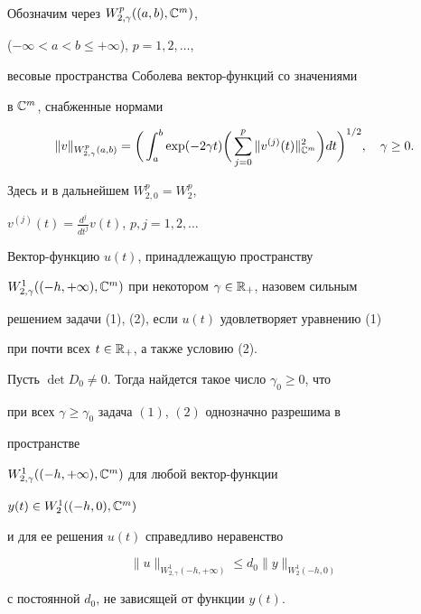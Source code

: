  


Обозначим через $W^p_{2,\gamma}((a,b),\Bbb C^m)$, 


($-\infty<a<b\le+\infty$), $p=1,2,\dotsc$, 


весовые пространства Соболева вектор-функций со значениями 


в $\Bbb C^m$, снабженные нормами 


$$ 


\|v\|_{W^p_{2,\gamma}(a,b)}=\bigg(\int^b_a\exp(-2\gamma t)\bigg( 


\sum^p_{j=0}\|v^{(j)}(t)\|^2_{\Bbb C^m}\bigg)dt\bigg)^{1/2}, 


\quad \gamma\ge0. 


$$ 


Здесь и в дальнейшем $W^p_{2,0}=W^p_2$, 


$v^{(j)}(t)=\frac{d^j}{dt^j}v(t)$, $p,j=1,2,\dotsc$ 


 


\begin{defnnonum} 


Вектор-функцию $u(t)$, принадлежащую пространству 


$W^1_{2,\gamma}((-h,+\infty),\Bbb C^m)$ при некотором $\gamma\in\Bbb 


R_+$, назовем сильным 


решением задачи (1), (2), если $u(t)$ удовлетворяет уравнению (1) 


при почти всех $t\in\Bbb R_+$, а также условию (2). 


\end{defnnonum} 


 


\begin{lem} 


Пусть $\det D_0\ne0$. Тогда найдется такое число $\gamma_0\ge0$, что 


при всех $\gamma\ge\gamma_0$ задача $(1)$, $(2)$ однозначно разрешима в 


пространстве 


$W^1_{2,\gamma}((-h,+\infty),\Bbb C^m)$ для любой вектор-функции 


$y(t)\in W^1_2((-h,0),\Bbb C^m)$ 


и для ее решения $u(t)$ справедливо неравенство 


$$ 


\|u\|_{W^1_{2,\gamma}(-h,+\infty)}\le d_0 


\|y\|_{W^1_2(-h,0)} 


$$ 


с постоянной $d_0$, не зависящей от функции $y(t)$. 


\end{lem} 


